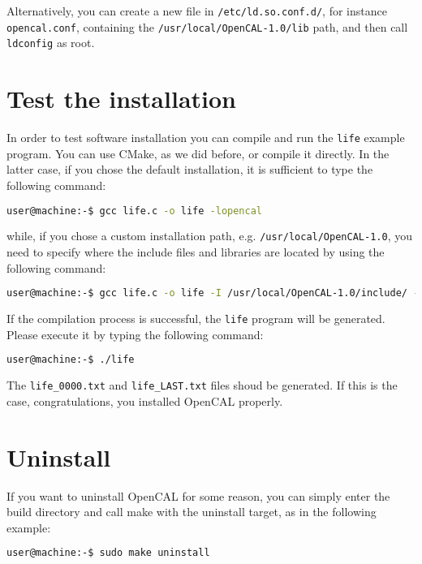 Alternatively, you can create
a new file in \verb'/etc/ld.so.conf.d/', for instance
\verb'opencal.conf', containing the \verb'/usr/local/OpenCAL-1.0/lib'
path, and then call \verb'ldconfig' as root.

\section{Test the installation}

In order to test software installation you can compile and run the
\verb'life' example program. You can use CMake, as we did before, or
compile it directly. In the latter case, if you chose the
default installation, it is sufficient to type the following command:
\begin{lstlisting}[numbers=none,language=bash,label={ch:quickstart:gcc}]
  user@machine:-$ gcc life.c -o life -lopencal
\end{lstlisting}
while, if you chose a custom installation path, e.g. \verb'/usr/local/OpenCAL-1.0', you need to specify where the include files and libraries are located by using the following command:
\begin{lstlisting}[numbers=none,language=bash,label={ch:quickstart:gcc-full}]
  user@machine:-$ gcc life.c -o life -I /usr/local/OpenCAL-1.0/include/ -L /usr/local/OpenCAL-1.0/lib/ -lopencal
\end{lstlisting}

If the compilation process is successful, the \verb'life' program will be
generated. Please execute it by typing the following command:
\begin{lstlisting}[numbers=none,language=bash,label={ch:quickstart:gcc}]
  user@machine:-$ ./life
\end{lstlisting}
The \verb'life_0000.txt' and \verb'life_LAST.txt' files shoud be
generated. If this is the case, congratulations, you installed
OpenCAL properly.

\section{Uninstall}

If you want to uninstall OpenCAL for some reason, you can simply enter
the build directory and call make with the uninstall target, as in the
following example:

\begin{lstlisting}[numbers=none,language=bash,label={ch:quickstart:sudouninstall}]
  user@machine:-$ sudo make uninstall
\end{lstlisting}

